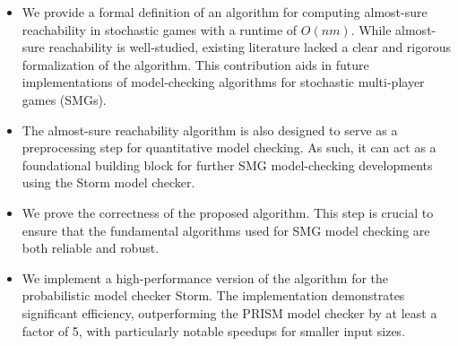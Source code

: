 \begin{itemize}
    \item We provide a formal definition of an algorithm for computing almost-sure reachability in stochastic games with a runtime of $O(nm)$. While almost-sure reachability is well-studied, existing literature lacked a clear and rigorous formalization of the algorithm. This contribution aids in future implementations of model-checking algorithms for stochastic multi-player games (SMGs).
    \item The almost-sure reachability algorithm is also designed to serve as a preprocessing step for quantitative model checking. As such, it can act as a foundational building block for further SMG model-checking developments using the Storm model checker.
    \item We prove the correctness of the proposed algorithm. This step is crucial to ensure that the fundamental algorithms used for SMG model checking are both reliable and robust.
    \item We implement a high-performance version of the algorithm for the probabilistic model checker Storm. The implementation demonstrates significant efficiency, outperforming the PRISM model checker by at least a factor of 5, with particularly notable speedups for smaller input sizes.
\end{itemize}

